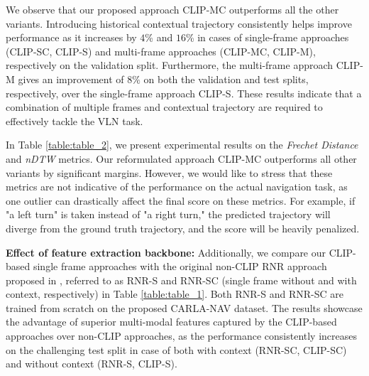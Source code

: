 \documentclass[11pt]{article}
\begin{document}
We observe that our proposed approach CLIP-MC outperforms all the other variants. Introducing historical contextual trajectory consistently helps improve performance as it increases by $4$\% and $16$\% in cases of single-frame approaches (CLIP-SC, CLIP-S) and multi-frame approaches (CLIP-MC, CLIP-M), respectively on the validation split. Furthermore, the multi-frame approach CLIP-M gives an improvement of $8\%$ on both the validation and test splits, respectively, over the single-frame approach CLIP-S. These results indicate that a combination of multiple frames and contextual trajectory are required to effectively tackle the VLN task.

In Table \ref{table:table_2}, we present experimental results on the \textit{Frechet Distance} and \textit{nDTW} metrics. Our reformulated approach CLIP-MC outperforms all other variants by significant margins. However, we would like to stress that these metrics are not indicative of the performance on the actual navigation task, as one outlier can drastically affect the final score on these metrics. For example, if "a left turn" is taken instead of "a right turn," the predicted trajectory will diverge from the ground truth trajectory, and the score will be heavily penalized.  

\textbf{Effect of feature extraction backbone: }Additionally, we compare our CLIP-based single frame approaches with the original non-CLIP RNR approach proposed in \cite{Rufus_2021}, referred to as RNR-S and RNR-SC (single frame without and with context, respectively) in Table \ref{table:table_1}. Both RNR-S and RNR-SC are trained from scratch on the proposed CARLA-NAV dataset. The results showcase the advantage of superior multi-modal features captured by the CLIP-based approaches over non-CLIP approaches, as the performance consistently increases on the challenging test split in case of both with context (RNR-SC, CLIP-SC) and without context (RNR-S, CLIP-S).
\end{document}
